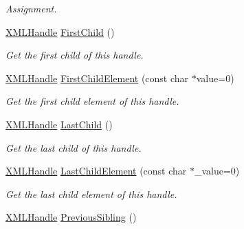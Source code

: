\begin{DoxyCompactItemize}
\begin{DoxyCompactList}\small\item\em Assignment. \end{DoxyCompactList}\item 
\hypertarget{classtinyxml2_1_1_x_m_l_handle_a536447dc7f54c0cd11e031dad94795ae}{}\hyperlink{classtinyxml2_1_1_x_m_l_handle}{X\+M\+L\+Handle} \hyperlink{classtinyxml2_1_1_x_m_l_handle_a536447dc7f54c0cd11e031dad94795ae}{First\+Child} ()\label{classtinyxml2_1_1_x_m_l_handle_a536447dc7f54c0cd11e031dad94795ae}

\begin{DoxyCompactList}\small\item\em Get the first child of this handle. \end{DoxyCompactList}\item 
\hypertarget{classtinyxml2_1_1_x_m_l_handle_a99edff695a3cd3feff8a329189140a33}{}\hyperlink{classtinyxml2_1_1_x_m_l_handle}{X\+M\+L\+Handle} \hyperlink{classtinyxml2_1_1_x_m_l_handle_a99edff695a3cd3feff8a329189140a33}{First\+Child\+Element} (const char $\ast$value=0)\label{classtinyxml2_1_1_x_m_l_handle_a99edff695a3cd3feff8a329189140a33}

\begin{DoxyCompactList}\small\item\em Get the first child element of this handle. \end{DoxyCompactList}\item 
\hypertarget{classtinyxml2_1_1_x_m_l_handle_a9d09f04435f0f2f7d0816b0198d0517b}{}\hyperlink{classtinyxml2_1_1_x_m_l_handle}{X\+M\+L\+Handle} \hyperlink{classtinyxml2_1_1_x_m_l_handle_a9d09f04435f0f2f7d0816b0198d0517b}{Last\+Child} ()\label{classtinyxml2_1_1_x_m_l_handle_a9d09f04435f0f2f7d0816b0198d0517b}

\begin{DoxyCompactList}\small\item\em Get the last child of this handle. \end{DoxyCompactList}\item 
\hypertarget{classtinyxml2_1_1_x_m_l_handle_a4073e768ebc434b2605343b709a9a554}{}\hyperlink{classtinyxml2_1_1_x_m_l_handle}{X\+M\+L\+Handle} \hyperlink{classtinyxml2_1_1_x_m_l_handle_a4073e768ebc434b2605343b709a9a554}{Last\+Child\+Element} (const char $\ast$\+\_\+value=0)\label{classtinyxml2_1_1_x_m_l_handle_a4073e768ebc434b2605343b709a9a554}

\begin{DoxyCompactList}\small\item\em Get the last child element of this handle. \end{DoxyCompactList}\item 
\hypertarget{classtinyxml2_1_1_x_m_l_handle_a428374e756f4db4cbc287fec64eae02c}{}\hyperlink{classtinyxml2_1_1_x_m_l_handle}{X\+M\+L\+Handle} \hyperlink{classtinyxml2_1_1_x_m_l_handle_a428374e756f4db4cbc287fec64eae02c}{Previous\+Sibling} ()\label{classtinyxml2_1_1_x_m_l_handle_a428374e756f4db4cbc287fec64eae02c}


\end{DoxyCompactItemize}
